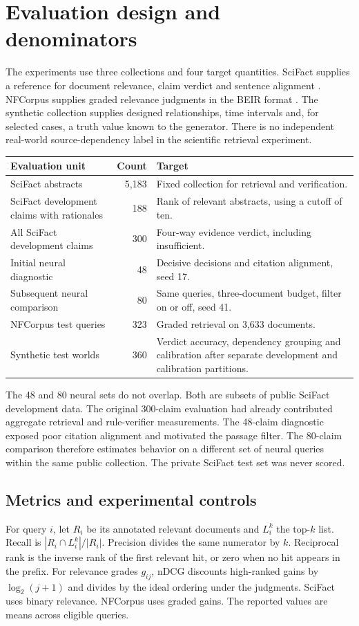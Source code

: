 \section{Evaluation design and denominators}
The experiments use three collections and four target quantities. SciFact supplies a reference for document relevance, claim verdict and sentence alignment \cite{SciFact}. NFCorpus supplies graded relevance judgments in the BEIR format \cite{BEIR}. The synthetic collection supplies designed relationships, time intervals and, for selected cases, a truth value known to the generator. There is no independent real-world source-dependency label in the scientific retrieval experiment.

\begin{center}\small
\begin{tabularx}{\linewidth}{@{}p{.30\linewidth}rX@{}}\toprule
Evaluation unit & Count & Target\\\midrule
SciFact abstracts & 5,183 & Fixed collection for retrieval and verification.\\
SciFact development claims with rationales & 188 & Rank of relevant abstracts, using a cutoff of ten.\\
All SciFact development claims & 300 & Four-way evidence verdict, including insufficient.\\
Initial neural diagnostic & 48 & Decisive decisions and citation alignment, seed 17.\\
Subsequent neural comparison & 80 & Same queries, three-document budget, filter on or off, seed 41.\\
NFCorpus test queries & 323 & Graded retrieval on 3,633 documents.\\
Synthetic test worlds & 360 & Verdict accuracy, dependency grouping and calibration after separate development and calibration partitions.\\\bottomrule
\end{tabularx}
\end{center}
The 48 and 80 neural sets do not overlap. Both are subsets of public SciFact development data. The original 300-claim evaluation had already contributed aggregate retrieval and rule-verifier measurements. The 48-claim diagnostic exposed poor citation alignment and motivated the passage filter. The 80-claim comparison therefore estimates behavior on a different set of neural queries within the same public collection. The private SciFact test set was never scored.

\subsection{Metrics and experimental controls}
For query $i$, let $R_i$ be its annotated relevant documents and $L_i^k$ the top-$k$ list. Recall is $|R_i\cap L_i^k|/|R_i|$. Precision divides the same numerator by $k$. Reciprocal rank is the inverse rank of the first relevant hit, or zero when no hit appears in the prefix. For relevance grades $g_{ij}$, nDCG discounts high-ranked gains by $\log_2(j+1)$ and divides by the ideal ordering under the judgments. SciFact uses binary relevance. NFCorpus uses graded gains. The reported values are means across eligible queries.

